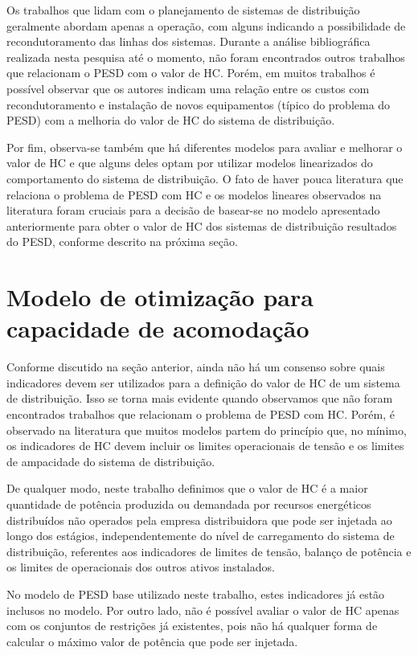Os trabalhos que lidam com o planejamento de sistemas de distribuição geralmente abordam apenas a operação, com alguns indicando a possibilidade de recondutoramento das linhas dos sistemas. Durante a análise bibliográfica realizada nesta pesquisa até o momento, não foram encontrados outros trabalhos que relacionam o \ac{PESD} com o valor de HC. Porém, em muitos trabalhos é possível observar que os autores indicam uma relação entre os custos com recondutoramento e instalação de novos equipamentos (típico do problema do \ac{PESD})  com a melhoria do valor de HC do sistema de distribuição.


Por fim, observa-se também que há diferentes modelos para avaliar e melhorar o valor de HC e que alguns deles optam por utilizar modelos linearizados do comportamento do sistema de distribuição. O fato de haver pouca literatura que relaciona o problema de PESD com HC e os modelos lineares observados na literatura foram cruciais para a decisão de basear-se no modelo apresentado anteriormente para obter o valor de HC dos sistemas de distribuição resultados do PESD, conforme descrito na próxima seção.

\section{Modelo de otimização para capacidade de acomodação}

Conforme discutido na seção anterior, ainda não há um consenso sobre quais indicadores devem ser utilizados para a definição do valor de \ac{HC} de um sistema de distribuição. Isso se torna mais evidente quando observamos que não foram encontrados trabalhos que relacionam o problema de \ac{PESD} com \ac{HC}. Porém, é observado na literatura que muitos modelos partem do princípio que, no mínimo, os indicadores de HC devem incluir os limites operacionais de tensão e os limites de ampacidade do sistema de distribuição.

De qualquer modo, neste trabalho definimos que o valor de \ac{HC} é a maior quantidade de potência produzida ou demandada por recursos energéticos distribuídos não operados pela empresa distribuidora que pode ser injetada ao longo dos estágios, independentemente do nível de carregamento do sistema de distribuição, referentes aos indicadores de limites de tensão, balanço de potência e os limites de operacionais dos outros ativos instalados.

No modelo de \ac{PESD} base utilizado neste trabalho, estes indicadores já estão inclusos no modelo. Por outro lado, não é possível avaliar o valor de HC apenas com os conjuntos de restrições já existentes, pois não há qualquer forma de calcular o máximo valor de potência que pode ser injetada. 

